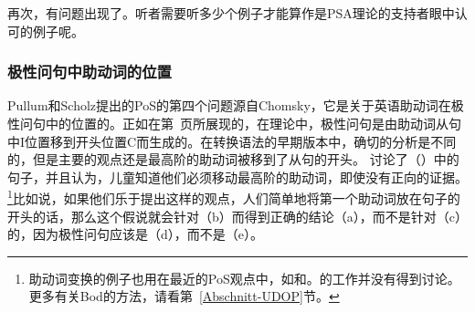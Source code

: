 再次，有问题出现了。听者需要听多少个例子才能算作是PSA理论的支持者眼中认可的例子呢。

\subsubsection{极性问句中助动词的位置}
\label{Abschnitt-Hilfsverbumstellung}

Pullum和Scholz提出的PoS的第四个问题源自Chomsky，它是关于英语助动词在极性问句中的位置的。正如在第~\pageref{Seite-GB-Entscheidungsfragen-Englisch}页所展现的，在\gb 理论中，极性问句是由助动词从句中I位置移到开头位置C而生成的。在转换语法的早期版本中，确切的分析是不同的，但是主要的观点还是最高阶的助动词被移到了从句的开头。
 \citet[--33]{Chomsky71a-u}讨论了（）中的句子，并且认为，儿童知道他们必须移动最高阶的助动词，即使没有正向的证据。\footnote{
 助动词变换的例子也用在最近的PoS观点中，如和。\citet{Bod2009a}的工作并没有得到讨论。更多有关Bod的方法，请看第~\ref{Abschnitt-UDOP}节。
 }比如说，如果他们乐于提出这样的观点，人们简单地将第一个助动词放在句子的开头的话，那么这个假说就会针对（b）而得到正确的结论（a），而不是针对（c）的，因为极性问句应该是（d），而不是（e）。
